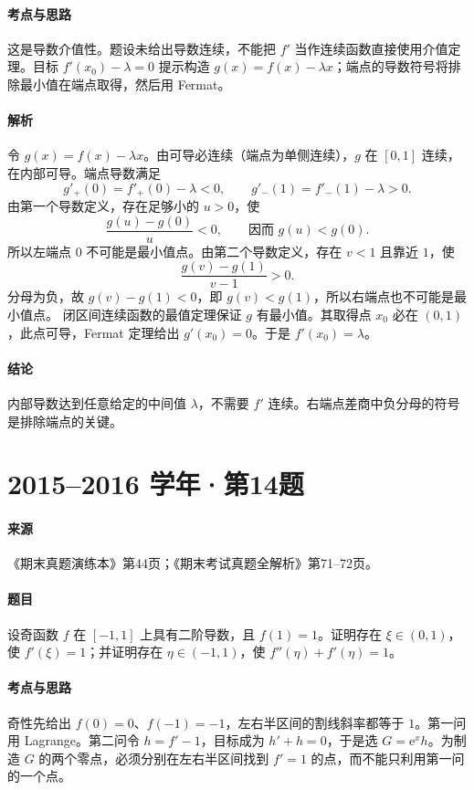 \documentclass[UTF8,fontset=fandol,12pt,oneside,openany]{ctexrep}
\newcommand{\ee}{\mathrm e}
\theoremstyle{definition}
\begin{document}
\paragraph{考点与思路}
这是导数介值性。题设未给出导数连续，不能把 $f'$ 当作连续函数直接使用介值定理。目标 $f'(x_0)-\lambda=0$ 提示构造 $g(x)=f(x)-\lambda x$；端点的导数符号将排除最小值在端点取得，然后用 Fermat。
\paragraph{解析}
令 $g(x)=f(x)-\lambda x$。由可导必连续（端点为单侧连续），$g$ 在 $[0,1]$ 连续，在内部可导。端点导数满足
\[
g'_+(0)=f'_+(0)-\lambda<0,
\qquad g'_-(1)=f'_-(1)-\lambda>0.
\]
由第一个导数定义，存在足够小的 $u>0$，使
\[
\frac{g(u)-g(0)}u<0,
\qquad\text{因而 }g(u)<g(0).
\]
所以左端点 $0$ 不可能是最小值点。由第二个导数定义，存在 $v<1$ 且靠近 $1$，使
\[
\frac{g(v)-g(1)}{v-1}>0.
\]
分母为负，故 $g(v)-g(1)<0$，即 $g(v)<g(1)$，所以右端点也不可能是最小值点。
闭区间连续函数的最值定理保证 $g$ 有最小值。其取得点 $x_0$ 必在 $(0,1)$，此点可导，Fermat 定理给出 $g'(x_0)=0$。于是 $f'(x_0)=\lambda$。
\paragraph{结论}内部导数达到任意给定的中间值 $\lambda$，不需要 $f'$ 连续。右端点差商中负分母的符号是排除端点的关键。

\par\addvspace{18pt}\noindent\begin{minipage}{\linewidth}
\section{2015--2016 学年·第14题}
\paragraph{来源}《期末真题演练本》第44页；《期末考试真题全解析》第71--72页。
\paragraph{题目}
设奇函数 $f$ 在 $[-1,1]$ 上具有二阶导数，且 $f(1)=1$。证明存在 $\xi\in(0,1)$，使 $f'(\xi)=1$；并证明存在 $\eta\in(-1,1)$，使 $f''(\eta)+f'(\eta)=1$。
\end{minipage}\par
\paragraph{考点与思路}
奇性先给出 $f(0)=0$、$f(-1)=-1$，左右半区间的割线斜率都等于 $1$。第一问用 Lagrange。第二问令 $h=f'-1$，目标成为 $h'+h=0$，于是选 $G=\ee^xh$。为制造 $G$ 的两个零点，必须分别在左右半区间找到 $f'=1$ 的点，而不能只利用第一问的一个点。
\end{document}
